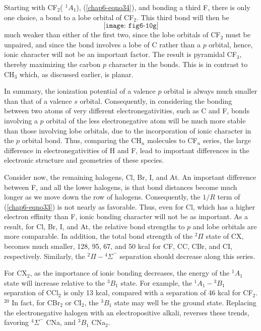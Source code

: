 Starting with CF$_2$( ${^1A}_1$), (\ref{chap6-eqno34}), and bonding a
third F, there is only one choice, a bond to a lobe orbital of CF$_2$.
This third bond will then be
\begin{equation}
\texttt{[image: fig6-10g]}
\end{equation}
much weaker than either of the first two, since the lobe orbitals of 
CF$_2$ must be unpaired, and since the bond involves a lobe of C 
rather than a $p$ orbital, hence, ionic character will not be an 
important factor.  The result is pyramidal CF$_3$, thereby maximizing 
the carbon $p$ character in the bonds.  This is in contrast to CH$_3$ 
which, as discussed earlier, is planar.

In summary, the ionization potential of a valence $p$ orbital is 
always much smaller than that of a valence $s$ orbital.  Consequently, 
in considering the bonding between two atoms of very different 
electronegativities, such as C and F, bonds involving a $p$ orbital 
of the less electronegative atom will be much more stable than those 
involving lobe orbitals, due to the incorporation of ionic character in 
the $p$ orbital bond.  Thus, comparing the CH$_n$ molecules to CF$_n$ 
series, the large difference in electronegativities of H and F, lead 
to important differences in the electronic structure and geometries 
of these species.

Consider now, the remaining halogens, Cl, Br, I, and At.  An important
difference between F, and all the lower halogens, is that bond
distances become much longer as we move down the row of halogens.
Consequently, the $1/R$ term of (\ref{chap6-eqno33}) is not nearly as
favorable.  Thus, even for Cl, which has a higher electron effinity
than F, ionic bonding character will not be as important.  As a
result, for Cl, Br, I, and At, the relative bond strengths to $p$ and
lobe orbitals are more comparable.  In addition, the total bond
strength of the ${^2\Pi}$ state of CX, becomes much smaller, 128, 95,
67, and 50 kcal for CF, CC, CBr, and CI, respectively.  Similarly, the
${^2\Pi} - {^4\Sigma}^-$ separation should decrease along this series.

For CX$_2$, as the importance of ionic bonding decreases, the energy 
of the ${^1A}_1$ state will increase relative to the ${^3B}_1$ state.  
For example, the ${^1A}_1 - {^3B}_1$ separation of CCl$_2$ is only 13 
kcal, compared with a separation of 46 kcal for CF$_2$.$^{20}$  In 
fact, for CBr$_2$ or CI$_2$, the ${^3B}_1$ state may well be the 
ground state.  Replacing the electronegative halogen with an 
electropositive alkali, reverses these trends, favoring 
${^4\Sigma}^-$ CNa, and ${^3B}_1$ CNa$_2$.

